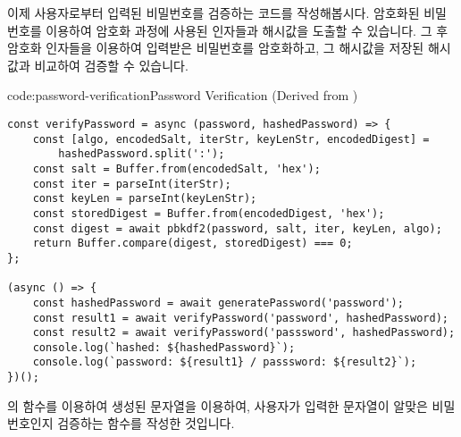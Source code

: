 이제 사용자로부터 입력된 비밀번호를 검증하는 코드를 작성해봅시다. 암호화된 비밀번호를 이용하여 암호화 과정에 사용된 인자들과 해시값을 도출할 수 있습니다. 그 후 암호화 인자들을 이용하여 입력받은 비밀번호를 암호화하고, 그 해시값을 저장된 해시값과 비교하여 검증할 수 있습니다.

\begin{codeenv}{code:password-verification}{Password Verification (Derived from )}\begin{verbatim}
const verifyPassword = async (password, hashedPassword) => {
    const [algo, encodedSalt, iterStr, keyLenStr, encodedDigest] =
        hashedPassword.split(':');
    const salt = Buffer.from(encodedSalt, 'hex');
    const iter = parseInt(iterStr);
    const keyLen = parseInt(keyLenStr);
    const storedDigest = Buffer.from(encodedDigest, 'hex');
    const digest = await pbkdf2(password, salt, iter, keyLen, algo);
    return Buffer.compare(digest, storedDigest) === 0;
};

(async () => {
    const hashedPassword = await generatePassword('password');
    const result1 = await verifyPassword('password', hashedPassword);
    const result2 = await verifyPassword('passsword', hashedPassword);
    console.log(`hashed: ${hashedPassword}`);
    console.log(`password: ${result1} / passsword: ${result2}`);
})();
\end{verbatim}
\end{codeenv}

\은 의  함수를 이용하여 생성된 문자열을 이용하여, 사용자가 입력한 문자열이 알맞은 비밀번호인지 검증하는  함수를 작성한 것입니다.
